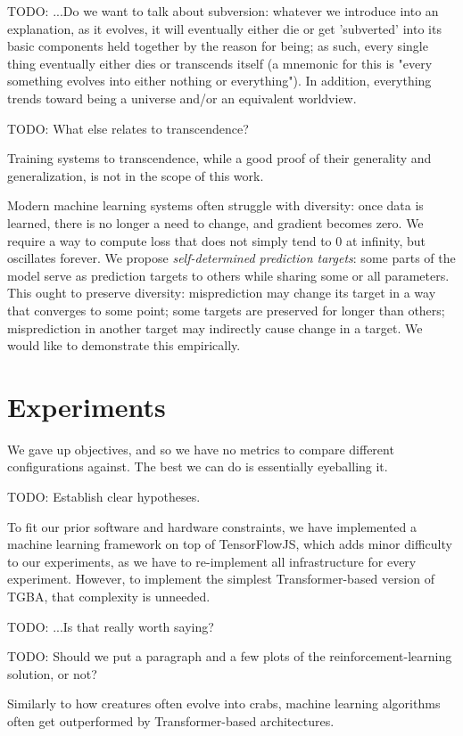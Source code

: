 \documentclass{article}
\begin{document}
    TODO: ...Do we want to talk about subversion: whatever we introduce into an explanation, as it evolves, it will eventually either die or get 'subverted' into its basic components held together by the reason for being; as such, every single thing eventually either dies or transcends itself (a mnemonic for this is "every something evolves into either nothing or everything"). In addition, everything trends toward being a universe and/or an equivalent worldview.

    TODO: What else relates to transcendence?

Training systems to transcendence, while a good proof of their generality and generalization, is not in the scope of this work.

Modern machine learning systems often struggle with diversity: once data is learned, there is no longer a need to change, and gradient becomes zero. We require a way to compute loss that does not simply tend to $0$ at infinity, but oscillates forever. We propose \textit{self-determined prediction targets}: some parts of the model serve as prediction targets to others while sharing some or all parameters. This ought to preserve diversity: misprediction may change its target in a way that converges to some point; some targets are preserved for longer than others; misprediction in another target may indirectly cause change in a target. We would like to demonstrate this empirically.

\section{Experiments}

We gave up objectives, and so we have no metrics to compare different configurations against. The best we can do is essentially eyeballing it.

    TODO: Establish clear hypotheses.

To fit our prior software and hardware constraints, we have implemented a machine learning framework on top of TensorFlowJS, which adds minor difficulty to our experiments, as we have to re-implement all infrastructure for every experiment. However, to implement the simplest Transformer-based version of TGBA, that complexity is unneeded.

    TODO: ...Is that really worth saying?

    TODO: Should we put a paragraph and a few plots of the reinforcement-learning solution, or not?

Similarly to how creatures often evolve into crabs, machine learning algorithms often get outperformed by Transformer-based architectures.
\end{document}
